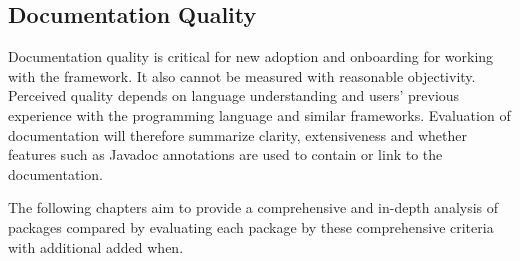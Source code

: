 \subsection{Documentation Quality}

Documentation quality is critical for new adoption and onboarding for working
with the framework. It also cannot be measured with reasonable objectivity.
Perceived quality depends on language understanding and users’ previous
experience with the programming language and similar frameworks. Evaluation of
documentation will therefore summarize clarity, extensiveness and whether
features such as Javadoc annotations are used to contain or link to the
documentation.


The following chapters aim to provide a comprehensive and in-depth analysis of
packages compared by evaluating each package by these comprehensive criteria
with additional added when.